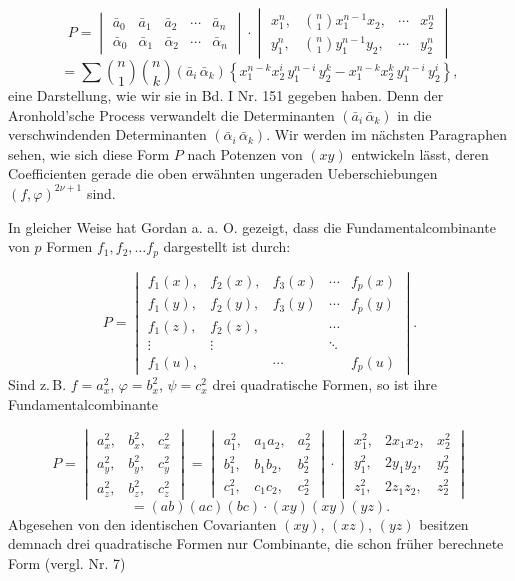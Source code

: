 \documentclass[11pt]{article}
\providecommand{\gesperrt}[1]{\textls[130]{#1}}
\providecommand{\weberpage}[1]{}
\begin{document}
\weberpage{72}
\[
P = \begin{vmatrix} \bar a_0 & \bar a_1 & \bar a_2 & \cdots & \bar a_n \\ \bar \alpha_0 & \bar \alpha_1 & \bar \alpha_2 & \cdots & \bar \alpha_n \end{vmatrix} \cdot \begin{vmatrix} x_1^n, & \binom{n}{1} x_1^{n-1} x_2, & \cdots & x_2^n \\ y_1^n, & \binom{n}{1} y_1^{n-1} y_2, & \cdots & y_2^n \end{vmatrix}
\]
\[
= \sum \binom{n}{1}\binom{n}{k} (\bar a_i\, \bar \alpha_k) \left\{ x_1^{n-k} x_2^i\, y_1^{n-i}\, y_2^k - x_1^{n-k} x_2^k\, y_1^{n-i}\, y_2^i \right\},
\]
eine Darstellung, wie wir sie in Bd. I Nr. 151 gegeben haben. Denn der Aronhold'sche Process verwandelt die Determinanten $(\bar a_i\, \bar \alpha_k)$ in die verschwindenden Determinanten $(\bar \alpha_i\, \bar \alpha_k)$. Wir werden im nächsten Paragraphen sehen, wie sich diese Form $P$ nach Potenzen von $(xy)$ entwickeln lässt, deren Coefficienten gerade die oben erwähnten ungeraden Ueberschiebungen $(f, \varphi)^{2\nu+1}$ sind.

In gleicher Weise hat Gordan a. a. O. gezeigt, dass die Fundamentalcombinante von $p$ Formen $f_1, f_2, \ldots f_p$ dargestellt ist durch:

\[
P = \begin{vmatrix}
f_1(x), & f_2(x), & f_3(x) & \cdots & f_p(x) \\
f_1(y), & f_2(y), & f_3(y) & \cdots & f_p(y) \\
f_1(z), & f_2(z), & & \cdots & \\
\vdots & \vdots & & \ddots & \\
f_1(u), & & \cdots & & f_p(u)
\end{vmatrix} .
\]
Sind z.\,B. $f = a_x^2$, $\varphi = b_x^2$, $\psi = c_x^2$ drei quadratische Formen, so ist ihre Fundamentalcombinante

\[
P = \begin{vmatrix} a_x^2, & b_x^2, & c_x^2 \\ a_y^2, & b_y^2, & c_y^2 \\ a_z^2, & b_z^2, & c_z^2 \end{vmatrix}
= \begin{vmatrix} a_1^2, & a_1 a_2, & a_2^2 \\ b_1^2, & b_1 b_2, & b_2^2 \\ c_1^2, & c_1 c_2, & c_2^2 \end{vmatrix} \cdot
\begin{vmatrix} x_1^2, & 2 x_1 x_2, & x_2^2 \\ y_1^2, & 2 y_1 y_2, & y_2^2 \\ z_1^2, & 2 z_1 z_2, & z_2^2 \end{vmatrix}
\]
\[
= (ab)(ac)(bc) \cdot (xy)(xy)(yz) . %
\]
Abgesehen von den identischen Covarianten $(xy)$, $(xz)$, $(yz)$ besitzen demnach drei quadratische Formen nur \gesperrt{eine} Combinante, die schon früher berechnete Form (vergl. Nr. 7)
\end{document}
